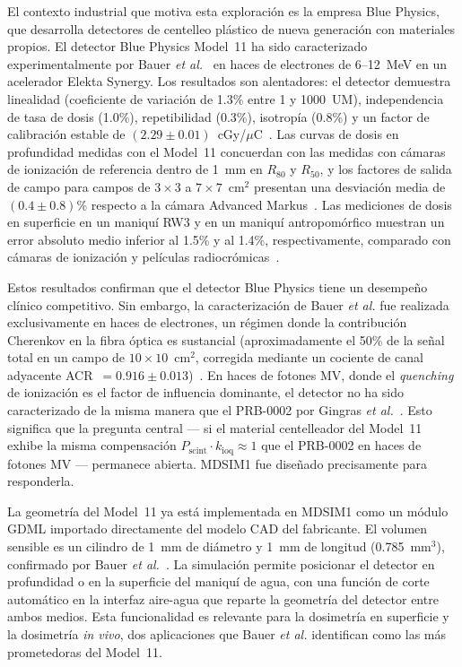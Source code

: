 \documentclass[11pt,a4paper]{article}
\begin{document}
El contexto industrial que motiva esta exploración es la empresa Blue Physics, que desarrolla detectores de centelleo plástico de nueva generación con materiales propios. El detector Blue Physics Model~11 ha sido caracterizado experimentalmente por Bauer \textit{et al.}~\cite{bauer2026} en haces de electrones de 6--12~MeV en un acelerador Elekta Synergy. Los resultados son alentadores: el detector demuestra linealidad (coeficiente de variación de 1.3\% entre 1 y 1000~UM), independencia de tasa de dosis (1.0\%), repetibilidad (0.3\%), isotropía (0.8\%) y un factor de calibración estable de $(2{.}29 \pm 0{.}01)$~cGy/$\mu$C~\cite{bauer2026}. Las curvas de dosis en profundidad medidas con el Model~11 concuerdan con las medidas con cámaras de ionización de referencia dentro de 1~mm en $R_{80}$ y $R_{50}$, y los factores de salida de campo para campos de $3 \times 3$ a $7 \times 7$~cm$^{2}$ presentan una desviación media de $(0{.}4 \pm 0{.}8)$\% respecto a la cámara Advanced Markus~\cite{bauer2026}. Las mediciones de dosis en superficie en un maniquí RW3 y en un maniquí antropomórfico muestran un error absoluto medio inferior al 1.5\% y al 1.4\%, respectivamente, comparado con cámaras de ionización y películas radiocrómicas~\cite{bauer2026}.

Estos resultados confirman que el detector Blue Physics tiene un desempeño clínico competitivo. Sin embargo, la caracterización de Bauer \textit{et al.} fue realizada exclusivamente en haces de electrones, un régimen donde la contribución Cherenkov en la fibra óptica es sustancial (aproximadamente el 50\% de la señal total en un campo de $10 \times 10$~cm$^{2}$, corregida mediante un cociente de canal adyacente ACR~$= 0{.}916 \pm 0{.}013$)~\cite{bauer2026}. En haces de fotones MV, donde el \textit{quenching} de ionización es el factor de influencia dominante, el detector no ha sido caracterizado de la misma manera que el PRB-0002 por Gingras \textit{et al.}~\cite{gingras2025}. Esto significa que la pregunta central --- si el material centelleador del Model~11 exhibe la misma compensación $P_{\mathrm{scint}} \cdot k_{\mathrm{ioq}} \approx 1$ que el PRB-0002 en haces de fotones MV --- permanece abierta. MDSIM1 fue diseñado precisamente para responderla.

La geometría del Model~11 ya está implementada en MDSIM1 como un módulo GDML importado directamente del modelo CAD del fabricante. El volumen sensible es un cilindro de 1~mm de diámetro y 1~mm de longitud (0.785~mm$^{3}$), confirmado por Bauer \textit{et al.}~\cite{bauer2026}. La simulación permite posicionar el detector en profundidad o en la superficie del maniquí de agua, con una función de corte automático en la interfaz aire-agua que reparte la geometría del detector entre ambos medios. Esta funcionalidad es relevante para la dosimetría en superficie y la dosimetría \textit{in vivo}, dos aplicaciones que Bauer \textit{et al.} identifican como las más prometedoras del Model~11.
\end{document}
